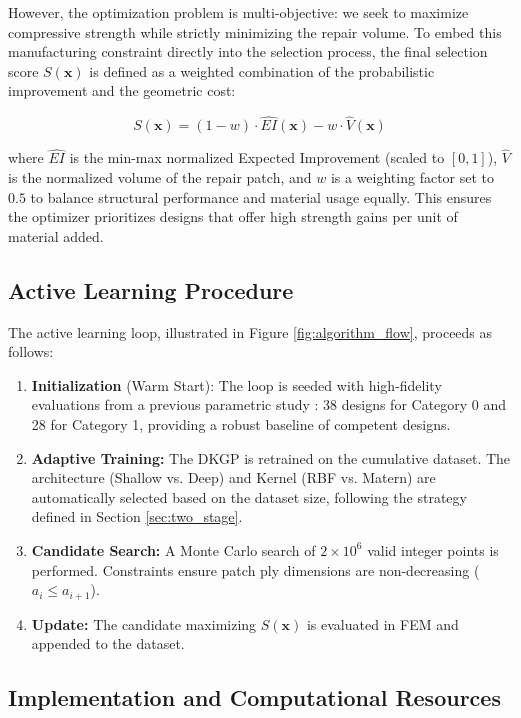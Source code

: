 \documentclass[
  preprint,
  12pt,
  a4paper
]{elsarticle}
\newcommand{\new}[1]{#1}
\begin{document}
However, the optimization problem is multi-objective: we seek to maximize compressive strength while strictly minimizing the repair volume. To embed this manufacturing constraint directly into the selection process, the final selection score $S(\mathbf{x})$ is defined as a weighted combination of the probabilistic improvement and the geometric cost:

\begin{equation}
    S(\mathbf{x}) = (1 - w) \cdot \widehat{EI}(\mathbf{x}) - w \cdot \widehat{V}(\mathbf{x})
\end{equation}

where $\widehat{EI}$ is the min-max normalized Expected Improvement (scaled to $[0,1]$), $\widehat{V}$ is the normalized volume of the repair patch, and $w$ is a weighting factor set to $0.5$ to balance structural performance and material usage equally. This ensures the optimizer prioritizes designs that offer high strength gains per unit of material added.

\subsection{Active Learning Procedure}
The active learning loop, illustrated in Figure \ref{fig:algorithm_flow}, proceeds as follows:

\begin{enumerate}
    \item \textbf{Initialization} (Warm Start): The loop is seeded with \new{high-fidelity evaluations from a previous parametric study \cite{psarras2024design}: 38 designs for Category 0 and 28 for Category 1,} providing a robust baseline of competent designs.
    \item \textbf{Adaptive Training:} The DKGP is retrained on the cumulative dataset. The architecture (Shallow vs. Deep) and Kernel (RBF vs. Matern) are automatically selected based on the dataset size, following the strategy defined in Section \ref{sec:two_stage}.
    \item \textbf{Candidate Search:} A Monte Carlo search of $2 \times 10^6$ valid integer points is performed. Constraints ensure \new{patch ply} dimensions are non-decreasing ($a_i \leq a_{i+1}$).
    \item \textbf{Update:} The candidate maximizing $S(\mathbf{x})$ is evaluated in FEM and appended to the dataset.
\end{enumerate}

\subsection{Implementation and Computational Resources}
\label{sec:implementation}
\end{document}
